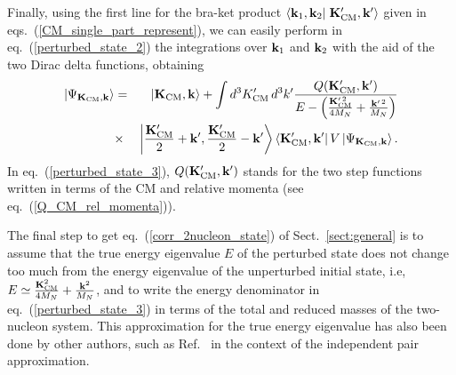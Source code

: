 \documentclass[aps,twocolumn,showpacs,preprintnumbers,amsmath,amssymb,nofootinbib,superscriptaddress,showkeys,noeprint]{revtex4-1}
\newcommand{\nk}{{\bf k}}
\newcommand{\nK}{{\bf K}}
\begin{document}
Finally, using the first line for the bra-ket product $\left\langle
\nk_1,\nk_2\right| \left.  \nK^\prime_{\rm CM},\nk^\prime
\right\rangle$ given in eqs.~(\ref{CM_single_part_represent}), we can
easily perform in eq.~(\ref{perturbed_state_2}) the integrations over
$\nk_1$ and $\nk_2$ with the aid of the two Dirac delta functions,
obtaining
\begin{eqnarray}
\left| \Psi_{\nK_{\rm CM},\nk}\right\rangle&=&
\left| \nK_{\rm CM},\nk\right\rangle + 
\int d^3K^\prime_{\rm CM} \, d^3k^\prime
\frac{Q(\nK^\prime_{\rm CM}, \nk^\prime)}{E- \left( 
\frac{\nK^{\prime\,2}_{\rm CM}}{4M_N} + 
\frac{\nk^{\prime\,2}}{M_N}\right)} \nonumber\\
&\times& \left| \frac{\nK^\prime_{\rm CM}}{2} + \nk^\prime,
\frac{\nK^\prime_{\rm CM}}{2} - \nk^\prime \right\rangle
\left\langle \nK^\prime_{\rm CM},\nk^\prime \right| V 
\left| \Psi_{\nK_{\rm CM},\nk}\right\rangle. \nonumber\\ \label{perturbed_state_3}
\end{eqnarray}
In eq.~(\ref{perturbed_state_3}), $Q(\nK^\prime_{\rm CM}, \nk^\prime)$
stands for the two step functions written in terms of the CM and
relative momenta (see eq.~(\ref{Q_CM_rel_momenta})).

The final step to get eq.~(\ref{corr_2nucleon_state}) of
Sect.~\ref{sect:general} is to assume that the true energy eigenvalue
$E$ of the perturbed state does not change too much from the energy
eigenvalue of the unperturbed initial state, i.e, $E\simeq
\frac{\nK^{2}_{\rm CM}}{4M_N} + \frac{\nk^{2}}{M_N}$, and to write the
energy denominator in eq.~(\ref{perturbed_state_3}) in terms of the
total and reduced masses of the two-nucleon system. This approximation
for the true energy eigenvalue has also been done by other authors,
such as Ref.~\cite{Walecka1995} in the context of the independent pair
approximation.
\end{document}
